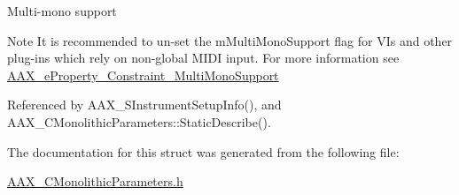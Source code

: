 Multi-\/mono support

\begin{DoxyNote}{Note}
It is recommended to un-\/set the {\ttfamily m\+Multi\+Mono\+Support} flag for V\+Is and other plug-\/ins which rely on non-\/global M\+I\+DI input. For more information see \mbox{\hyperlink{a00662_a13e384f22825afd3db6d68395b79ce0da83f671685958bdc668ef574d5a2d92b0}{A\+A\+X\+\_\+e\+Property\+\_\+\+Constraint\+\_\+\+Multi\+Mono\+Support}} 
\end{DoxyNote}


Referenced by A\+A\+X\+\_\+\+S\+Instrument\+Setup\+Info(), and A\+A\+X\+\_\+\+C\+Monolithic\+Parameters\+::\+Static\+Describe().



The documentation for this struct was generated from the following file\+:\begin{DoxyCompactItemize}
\item 
\mbox{\hyperlink{a00746}{A\+A\+X\+\_\+\+C\+Monolithic\+Parameters.\+h}}\end{DoxyCompactItemize}
